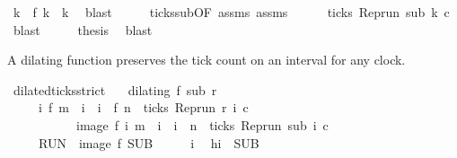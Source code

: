 \begin{isabellebody}
\ k\ \ {\isacartoucheopen}f\ k\ {\isacharequal}\ k{\isacartoucheclose}\ \isamarkupfalse%
\ blast\isanewline
\ \ \isamarkupfalse%
\ \isamarkupfalse%
\ ticks{\isacharunderscore}sub{\isacharbrackleft}OF\ assms{\isacharparenleft}{}{\isacharparenright}{\isacharbrackright}\ assms{\isacharparenleft}{}{\isacharparenright}\isanewline
\ \ \ \ \isamarkupfalse%
\ {\isacartoucheopen}ticks\ {\isacharparenleft}{\isacharparenleft}Rep{\isacharunderscore}run\ sub{\isacharparenright}\ k\ c{\isacharparenright}{\isacartoucheclose}\ \isamarkupfalse%
\ blast\isanewline
\ \ \isamarkupfalse%
\ \isamarkupfalse%
\ {\isacharquery}thesis\ \isamarkupfalse%
\ blast\isanewline
{}\isamarkupfalse%
%
\endisatagproof
{\isafoldproof}%
%
\isadelimproof
%
\endisadelimproof
%
\begin{isamarkuptext}%
A dilating function preserves the tick count on an interval for any clock.%
\end{isamarkuptext}\isamarkuptrue%
\isamarkupfalse%
\ dilated{\isacharunderscore}ticks{\isacharunderscore}strict{\isacharcolon}\isanewline
\ \ \ {\isacartoucheopen}dilating\ f\ sub\ r{\isacartoucheclose}\isanewline
\ \ \ \ \ {\isacartoucheopen}{\isacharbraceleft}i{\isachardot}\ f\ m\ {\isacharless}\ i\ {\isasymand}\ i\ {\isacharless}\ f\ n\ {\isasymand}\ ticks\ {\isacharparenleft}{\isacharparenleft}Rep{\isacharunderscore}run\ r{\isacharparenright}\ i\ c{\isacharparenright}{\isacharbraceright}\isanewline
\ \ \ \ \ \ \ \ \ \ {\isacharequal}\ image\ f\ {\isacharbraceleft}i{\isachardot}\ m\ {\isacharless}\ i\ {\isasymand}\ i\ {\isacharless}\ n\ {\isasymand}\ ticks\ {\isacharparenleft}{\isacharparenleft}Rep{\isacharunderscore}run\ sub{\isacharparenright}\ i\ c{\isacharparenright}{\isacharbraceright}{\isacartoucheclose}\isanewline
\ \ \ \ {\isacharparenleft}\ {\isacartoucheopen}{\isacharquery}RUN\ {\isacharequal}\ image\ f\ {\isacharquery}SUB{\isacartoucheclose}{\isacharparenright}\isanewline
%
\isadelimproof
%
\endisadelimproof
%
\isatagproof
{}\isamarkupfalse%
\isanewline
\ \ \isacommand{{\isacharbraceleft}}\isamarkupfalse%
\ \isamarkupfalse%
\ i\ \isamarkupfalse%
\ h{\isacharcolon}{\isacartoucheopen}i\ {\isasymin}\ {\isacharquery}SUB{\isacartoucheclose}\isanewline

\end{isabellebody}
